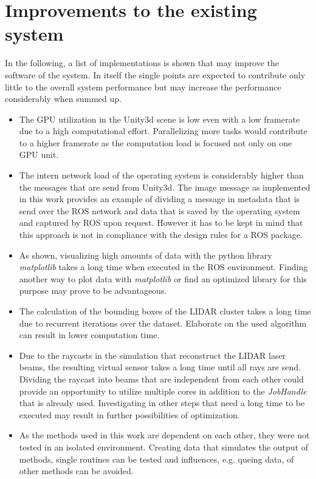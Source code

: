\chapter{Improvements to the existing system}\label{Attachlistb}	
In the following, a list of implementations is shown that may improve the software of the system. In itself the single points are expected to contribute only little to the overall system performance but may increase the performance considerably when summed up.
\begin{itemize}
	\item The \ac{GPU} utilization in the Unity3d scene is low even with a low framerate due to a high computational effort. Parallelizing more tasks would contribute to a higher framerate as the computation load is focused not only on one \ac{GPU} unit. 
	\item The intern network load of the operating system is considerably higher than the messages that are send from Unity3d. The image message as implemented in this work provides an example of dividing a message in metadata that is send over the \ac{ROS} network and data that is saved by the operating system and captured by \ac{ROS} upon request. However it has to be kept in mind that this approach is not in compliance with the design rules for a \ac{ROS} package.
	\item As shown, visualizing high amounts of data with the python library \textit{matplotlib} takes a long time when executed in the \ac{ROS} environment. Finding another way to plot data with \textit{matplotlib} or find an optimized library for this purpose may prove to be advantageous.   
	\item The calculation of the bounding boxes of the \ac{LIDAR} cluster takes a long time due to recurrent iterations over the dataset. Elaborate on the used algorithm can result in lower computation time. 
	\item Due to the raycasts in the simulation that reconstruct the \ac{LIDAR} laser beams, the resulting virtual sensor takes a long time until all rays are send. Dividing the raycast into beams that are independent from each other could provide an opportunity to utilize multiple cores in addition to the \textit{JobHandle} that is already used. Investigating in other steps that need a long time to be executed may result in further possibilities of optimization.
	\item  As the methods used in this work are dependent on each other, they were not tested in an isolated environment. Creating data that simulates the output of methods, single routines can be tested and influences, e.g. queing data, of other methods can be avoided.

\end{itemize}
